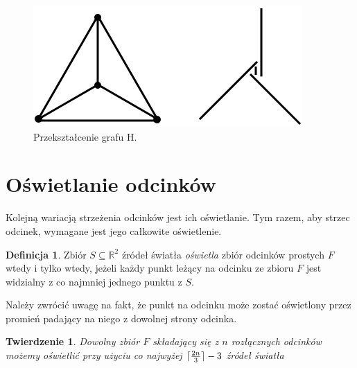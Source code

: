 \documentclass[brudnopis]{xmgr}
\DeclarePairedDelimiter\ceil{\lceil}{\rceil}
\newtheorem{Twierdzenie}{Twierdzenie}
\theoremstyle{definition}
\newtheorem{Definicja}{Definicja}
\begin{document}
\begin{figure}[ht!]
 \centering
  \includegraphics{rysunki/dolna_granica.png}
  \caption{Przekształcenie grafu H.}
  \label{fig:przeksztalcenie h}
\end{figure} 

\section{Oświetlanie odcinków}\label{oświetlanie odcinków}
Kolejną wariacją strzeżenia odcinków jest ich oświetlanie. Tym razem, aby strzec odcinek, wymagane jest jego całkowite oświetlenie.
\begin{Definicja}
	Zbiór $S \subseteq \mathbb{R}^2$ źródeł światła \emph{oświetla} zbiór odcinków prostych $F$ wtedy i tylko wtedy, jeżeli każdy punkt leżący na odcinku ze zbioru $F$ jest widzialny z co najmniej jednego punktu z $S$.
\end{Definicja} Należy zwrócić uwagę na fakt, że punkt na odcinku może zostać oświetlony przez promień padający na niego z dowolnej strony odcinka.

\begin{Twierdzenie} \cite{illumination}
 Dowolny zbiór $F$ składający się z $n$ rozłącznych odcinków możemy oświetlić przy użyciu co najwyżej $\ceil{\frac{2n}{3}} - 3$ źródeł światła
\end{Twierdzenie}
\end{document}
